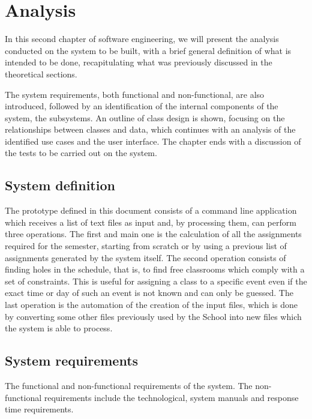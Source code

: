 \renewcommand{\documentname}{Analysis}

\chapter{Analysis}

In this second chapter of software engineering, we will present the analysis conducted on the system to be built, with a brief general definition of what is intended to be done, recapitulating what was previously discussed in the theoretical sections.

The system requirements, both functional and non-functional, are also introduced, followed by an identification of the internal components of the system, the subsystems. An outline of class design is shown, focusing on the relationships between classes and data, which continues with an analysis of the identified use cases and the user interface. The chapter ends with a discussion of the tests to be carried out on the system.



\section{System definition}

The prototype defined in this document consists of a command line application which receives a list of text files as input and, by processing them, can perform three operations. The first and main one is the calculation of all the assignments required for the semester, starting from scratch or by using a previous list of assignments generated by the system itself. The second operation consists of finding holes in the schedule, that is, to find free classrooms which comply with a set of constraints. This is useful for assigning a class to a specific event even if the exact time or day of such an event is not known and can only be guessed. The last operation is the automation of the creation of the input files, which is done by converting some other files previously used by the School into new files which the system is able to process.



\section{System requirements}

The functional and non-functional requirements of the system. The non-functional requirements include the technological, system manuals and response time requirements.

